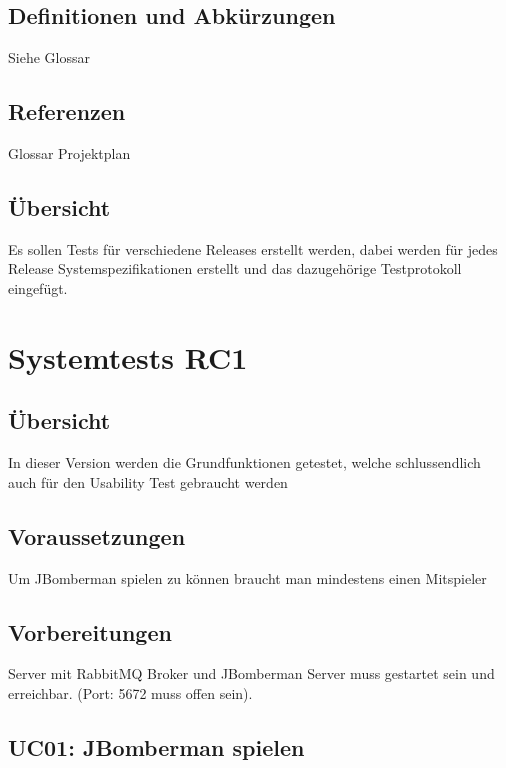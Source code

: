 \documentclass[11pt]{scrartcl}
\begin{document}
\subsection{Definitionen und Abkürzungen}
Siehe Glossar
\subsection{Referenzen}
Glossar
Projektplan
\subsection{Übersicht}
Es sollen Tests für verschiedene Releases erstellt werden, dabei werden für 
jedes Release Systemspezifikationen erstellt und das dazugehörige Testprotokoll 
eingefügt.
\section{Systemtests RC1}
\subsection{Übersicht}
In dieser Version werden die Grundfunktionen getestet, welche schlussendlich auch 
für den Usability Test gebraucht werden
\subsection{Voraussetzungen}
Um JBomberman spielen zu können braucht man mindestens einen Mitspieler
\subsection{Vorbereitungen}
Server mit RabbitMQ Broker und JBomberman Server muss gestartet sein und 
erreichbar. 
(Port: 5672 muss offen sein).
\subsection{UC01: JBomberman spielen}
\end{document}
